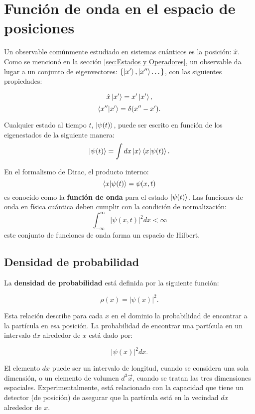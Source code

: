 \section{Función de onda en el espacio de posiciones}
\noindent Un observable comúnmente estudiado en sistemas cuánticos es la posición: $\hat{x}$. Como se mencionó en la sección \autoref{sec:Estados y Operadores}, un observable da lugar a un conjunto de eigenvectores: $\{\ket{x'}, \ket{x''}\dots \}$, con las siguientes propiedades:

$$\hat{x}\ket{x'} = x'\ket{x'},$$
$$\bra{x''}\ket{x'}=\delta(x''-x').$$

Cualquier estado al tiempo $t$, $\ket{\psi(t)}$, puede ser escrito en función de los eigenestados de la siguiente manera:
$$\ket{\psi(t)} = \int dx\ket{x}\bra{x}\ket{\psi(t)}.$$

En el formalismo de Dirac, el producto interno:
$$\bra{x}\ket{\psi(t)} = \psi(x,t)$$
es conocido como la \textbf{función de onda} para el estado $\ket{\psi(t)}$. Las funciones de onda en física cuántica deben cumplir con la condición de normalización:
$$\int_{-\infty}^{\infty}| \psi(x,t)|^2dx < \infty $$
este conjunto de funciones de onda forma un espacio de Hilbert.

\subsection{Densidad de probabilidad}

La \textbf{densidad de probabilidad} está definida por la siguiente función:

\begin{equation}
 \label{eq:density probablity}
\rho(x)=|\psi(x)|^2.
\end{equation}

Esta relación describe para cada $x$ en el dominio la probabilidad de encontrar a la partícula en esa posición. La probabilidad de encontrar una partícula en un intervalo $dx$ alrededor de $x$ está dado por:

 $$|\psi(x)|^2 dx. $$

 El elemento $dx$ puede ser un intervalo de longitud, cuando se considera una sola dimensión, o un elemento de volumen $d^3\vec{x}$, cuando se tratan las tres dimensiones espaciales. Experimentalmente, está relacionado con la capacidad que tiene un detector (de posición) de asegurar que la partícula está en la vecindad $dx$ alrededor de $x$.



